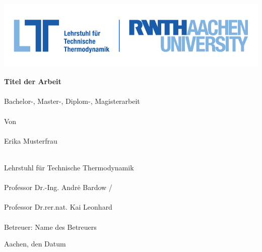 \begin{titlepage}
\begin{minipage}[t]{0.25\textwidth}\end{minipage}\hfill
\begin{minipage}[t]{0.7\textwidth}\includegraphics[width=\textwidth]{grafiken/rwth_ltt_de_rgb}\end{minipage}
	\vspace{11em}
	
	{\fontsize{24}{28} \selectfont \textbf{Titel der Arbeit}}\\
		\vspace{4em}\\
	{\fontsize{18}{22} \selectfont Bachelor-, Master-, Diplom-, Magisterarbeit}\\
		\vspace{2em}\\
	{\fontsize{14}{18} \selectfont Von}\\\\
	{\fontsize{14}{18} \selectfont Erika Musterfrau}\\\\
		\vspace{7em} 
		
{\fontsize{14}{18} \selectfont Lehrstuhl f\"{u}r Technische Thermodynamik}\\\\
{\fontsize{14}{18} \selectfont Professor Dr.-Ing. Andr\.{e} Bardow /}\\\\
{\fontsize{14}{18} \selectfont Professor Dr.rer.nat. Kai Leonhard}\\\\
{\fontsize{14}{18} \selectfont Betreuer: Name des Betreuers}\\
		\vspace{2em} 

\hfill\begin{minipage}{0.35\textwidth}{\fontsize{14}{16} \selectfont Aachen, den Datum}
\end{minipage}
\restoregeometry
\end{titlepage}

